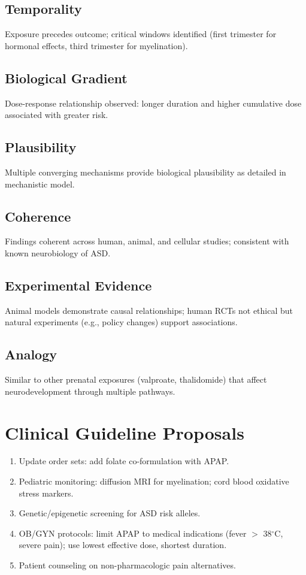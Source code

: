 \documentclass[12pt]{article}
\begin{document}
\subsection{Temporality}
Exposure precedes outcome; critical windows identified (first trimester for hormonal effects, third trimester for myelination).

\subsection{Biological Gradient}
Dose-response relationship observed: longer duration and higher cumulative dose associated with greater risk.

\subsection{Plausibility}
Multiple converging mechanisms provide biological plausibility as detailed in mechanistic model.

\subsection{Coherence}
Findings coherent across human, animal, and cellular studies; consistent with known neurobiology of ASD.

\subsection{Experimental Evidence}
Animal models demonstrate causal relationships; human RCTs not ethical but natural experiments (e.g., policy changes) support associations.

\subsection{Analogy}
Similar to other prenatal exposures (valproate, thalidomide) that affect neurodevelopment through multiple pathways.

\section{Clinical Guideline Proposals}
\begin{enumerate}
    \item Update order sets: add folate co-formulation with APAP.
    \item Pediatric monitoring: diffusion MRI for myelination; cord blood oxidative stress markers.
    \item Genetic/epigenetic screening for ASD risk alleles.
    \item OB/GYN protocols: limit APAP to medical indications (fever $>$ 38$^\circ$C, severe pain); use lowest effective dose, shortest duration.
    \item Patient counseling on non-pharmacologic pain alternatives.
\end{enumerate}
\end{document}
